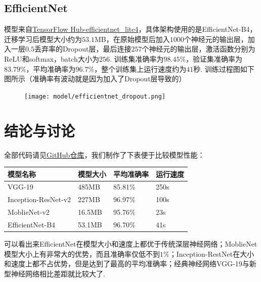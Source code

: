\documentclass[12pt, a4paper, oneside]{ctexart}
\numberwithin{equation}{section}  %
\begin{document}
\subsection{EfficientNet}
模型来自\href{https://tfhub.dev/tensorflow/efficientnet/lite4/classification/2}{TensorFlow Hub-efficientnet\_lite4}，具体架构使用的是EfficientNet-B4，迁移学习后模型大小约为$53.1$MB，在原始模型后加入$1000$个神经元的输出层，加入一层$0.5$丢弃率的Dropout层，最后连接$257$个神经元的输出层，激活函数分别为ReLU和softmax，batch大小为$256$. 训练集准确率为$98.45\%$，验证集准确率为$83.79\%$，平均准确率为$96.7\%$，整个训练集上运行速度约为$41$秒. 训练过程图如下图所示（准确率有波动就是因为加入了Dropout层导致的）\vspace*{-0.3cm}
\begin{figure}[htbp]
  \hspace*{-0.8cm}
  \centering
  \texttt{[image: model/efficientnet\_dropout.png]}
\end{figure}

\section{结论与讨论}
全部代码请见\href{https://github.com/wty-yy/CVPR_homeworks/tree/master/code/hw4}{GitHub仓库}，我们制作了下表便于比较模型性能：
\renewcommand\arraystretch{0.8} %
\begin{table}[!htbp] %
    \centering %
    \begin{tabular}{p{4cm}<{\centering}p{3cm}<{\centering}p{3cm}<{\centering}p{3cm}<{\centering}} %
        \toprule
      \textbf{模型名称}       & \textbf{模型大小} & \textbf{平均准确率} & \textbf{运行速度} \\
        \midrule
VGG-19              & 485MB         & 85.81\%       & 250s          \\
Inception-ResNet-v2 & 227MB         & 96.97\%        & 100s          \\
MoblieNet-v2        & 16.5MB        & 95.76\%        & 23s           \\
EfficientNet-B4     & 53.1MB        & 96.70\%         & 41s         \\
        \bottomrule
    \end{tabular}
\end{table}

可以看出来EfficientNet在模型大小和速度上都优于传统深层神经网络；MoblieNet模型大小上有非常大的优势，而且准确率仅低不到$1\%$；Inception-RestNet在大小和速度上都不占优势，但是达到了最高的平均准确率；经典神经网络VGG-19与新型神经网络相比差距就比较大了.
\end{document}

